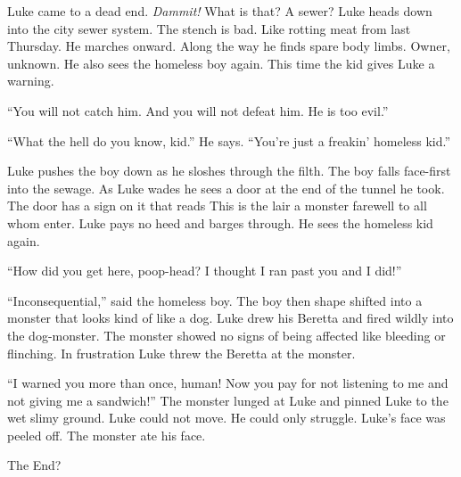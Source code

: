 Luke came to a dead end. {\em Dammit!} What is that? A sewer? Luke heads
down into the city sewer system. The stench is bad. Like rotting
meat from last Thursday. He marches onward. Along the way he finds
spare body limbs. Owner, unknown. He also sees the homeless boy
again. This time the kid gives Luke a warning.



``You will not catch him. And you will not defeat him. He is
too evil.''



``What the hell do you know, kid.'' He says.
``You're just a freakin' homeless
kid.''

Luke pushes the boy down as he sloshes through the filth. The boy falls
face-first into the sewage. As Luke wades he sees a door at the end of
the tunnel he took. The door has a sign on it that reads {\sc This is
  the lair a monster farewell to all whom enter}. Luke pays no heed and
barges through. He sees the homeless kid again.



``How did you get here, poop-head? I thought I ran past you
and I did!''



``Inconsequential,'' said the homeless boy. The boy then
shape shifted into a monster that looks kind of like a dog. Luke
drew his Beretta and fired wildly into the dog-monster. The monster
showed no signs of being affected like bleeding or flinching. In
frustration Luke threw the Beretta at the monster.



``I warned you more than once, human! Now you pay for not
listening to me and not giving me a sandwich!'' The monster
lunged at Luke and pinned Luke to the wet slimy ground. Luke could
not move. He could only struggle. Luke's face was peeled off.
The monster ate his face.



The End?


 



